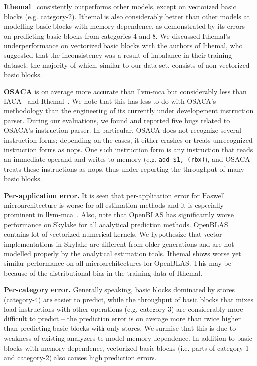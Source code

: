 \textbf{Ithemal}~\cite{ithemal} consistently outperforms other models, except on vectorized basic blocks (e.g. category-2).
Ithemal is also considerably better than other models at modelling basic blocks with memory dependence,
as demonstrated by its errors on predicting basic blocks from categories 4 and 8.
We discussed Ithemal's underperformance on vectorized basic blocks with the authors of Ithemal, who suggested that the inconsistency
was a result of imbalance in their training dataset;
the majority of which, similar to our data set, consists of non-vectorized basic blocks.

\textbf{OSACA}\cite{osaca} is on average more accurate than llvm-mca but
considerably less than IACA~\cite{iaca} and Ithemal~\cite{ithemal}.
We note that this has less to do with OSACA's methodology than the engineering of its currently under developement instruction parser.
During our evaluations, we found and reported five bugs related to OSACA's instruction parser.
In particular, OSACA does not recognize several instruction forms;
depending on the cases, it either crashes or treats unrecognized instruction forms as nops.
One such instruction form is any instruction that reads an immediate operand and writes to memory
(e.g. \verb|add $1, (rbx)|), and OSACA treats these instructions as nops, thus under-reporting the throughput of
many basic blocks.


\textbf{Per-application error.} It is seen that per-application error for Haswell microarchitecture is worse for all estimation methods and it is especially prominent in llvm-mca~\cite{llvm-mca}. Also, note that OpenBLAS has significantly worse performance on Skylake for all analytical prediction methods. OpenBLAS contains lot of vectorized numerical kernels. We hypothesize that vector implementations in Skylake are different from older generations and are not modelled properly by the analytical estimation tools. Ithemal shows worse yet  similar performance on all microarchitectures for OpenBLAS. This may be because of the distributional bias in the training data of Ithemal.

\textbf{Per-category error.} Generally speaking, basic blocks dominated by stores
(category-4) are easier to predict,
while the throughput of basic blocks that mixes load instructions
with other operations (e.g. category-3) are considerably
more difficult to predict -- the prediction error is on average more than
twice higher than predicting basic blocks with only stores. 
We surmise that this is due to weakness of existing analyzers to model 
memory dependence.
In addition to basic blocks with memory dependence,
vectorized basic blocks (i.e. parts of category-1 and category-2) also causes high prediction errors.

